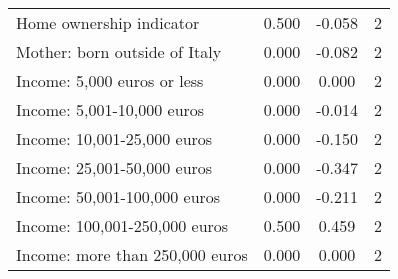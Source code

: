 \begin{table}[htbp]
\begin{tabular}{l*{1}{ccc}}
Home ownership indicator&       0.500         &      -0.058&           2\\
Mother: born outside of Italy&       0.000         &      -0.082&           2\\
Income: 5,000 euros or less&       0.000         &       0.000&           2\\
Income: 5,001-10,000 euros&       0.000         &      -0.014&           2\\
Income: 10,001-25,000 euros&       0.000         &      -0.150&           2\\
Income: 25,001-50,000 euros&       0.000         &      -0.347&           2\\
Income: 50,001-100,000 euros&       0.000         &      -0.211&           2\\
Income: 100,001-250,000 euros&       0.500\sym{**} &       0.459&           2\\
Income: more than 250,000 euros&       0.000         &       0.000&           2\\
\bottomrule
\end{tabular}
\end{table}
